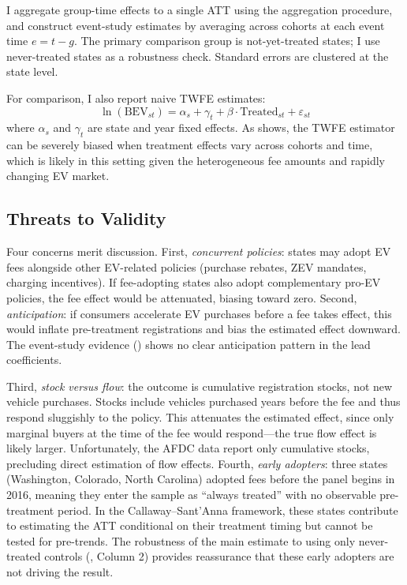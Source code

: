 \documentclass[12pt]{article}
\begin{document}
I aggregate group-time effects to a single ATT using the \citet{callaway2021difference} aggregation procedure, and construct event-study estimates by averaging across cohorts at each event time $e = t - g$. The primary comparison group is not-yet-treated states; I use never-treated states as a robustness check. Standard errors are clustered at the state level.

For comparison, I also report naive TWFE estimates:
\begin{equation}
\ln(\text{BEV}_{st}) = \alpha_s + \gamma_t + \beta \cdot \text{Treated}_{st} + \varepsilon_{st}
\end{equation}
\noindent where $\alpha_s$ and $\gamma_t$ are state and year fixed effects. As \citet{goodman2021difference} shows, the TWFE estimator can be severely biased when treatment effects vary across cohorts and time, which is likely in this setting given the heterogeneous fee amounts and rapidly changing EV market.

\subsection{Threats to Validity}

Four concerns merit discussion. First, \textit{concurrent policies}: states may adopt EV fees alongside other EV-related policies (purchase rebates, ZEV mandates, charging incentives). If fee-adopting states also adopt complementary pro-EV policies, the fee effect would be attenuated, biasing toward zero. Second, \textit{anticipation}: if consumers accelerate EV purchases before a fee takes effect, this would inflate pre-treatment registrations and bias the estimated effect downward. The event-study evidence () shows no clear anticipation pattern in the lead coefficients.

Third, \textit{stock versus flow}: the outcome is cumulative registration stocks, not new vehicle purchases. Stocks include vehicles purchased years before the fee and thus respond sluggishly to the policy. This attenuates the estimated effect, since only marginal buyers at the time of the fee would respond---the true flow effect is likely larger. Unfortunately, the AFDC data report only cumulative stocks, precluding direct estimation of flow effects. Fourth, \textit{early adopters}: three states (Washington, Colorado, North Carolina) adopted fees before the panel begins in 2016, meaning they enter the sample as ``always treated'' with no observable pre-treatment period. In the Callaway--Sant'Anna framework, these states contribute to estimating the ATT conditional on their treatment timing but cannot be tested for pre-trends. The robustness of the main estimate to using only never-treated controls (, Column 2) provides reassurance that these early adopters are not driving the result.
\end{document}
